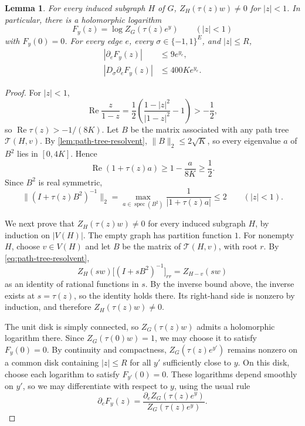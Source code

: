 \documentclass[11pt,reqno,letterpaper]{amsart}
\numberwithin{equation}{section}
\newtheorem{lemma}[lemma]{Lemma}
\theoremstyle{definition}
\theoremstyle{remark}
\newcommand{\norm}[1]{\lVert #1\rVert}
\begin{document}
\begin{lemma}\label{lem:analytic-derivatives}
For every induced subgraph $H$ of $G$,
$Z_H(\tau(z)w)\ne0$ for $|z|<1$. In particular, there is a
holomorphic logarithm
\[
 F_y(z)=\log Z_G(\tau(z)e^y)
 \qquad(|z|<1)
\]
with $F_y(0)=0$. For every edge $e$, every
$\sigma\in\{-1,1\}^E$, and $|z|\le R$,
\begin{align}
 |\partial_eF_y(z)|&\le9e^{y_e},
 \label{eq:analytic-gradient-bound}\\
 |D_\sigma\partial_eF_y(z)|&\le400K e^{y_e}.
 \label{eq:analytic-signed-hessian-bound}
\end{align}
\end{lemma}

\begin{proof}
For $|z|<1$,
\[
 \operatorname{Re}\frac{z}{1-z}
 =\frac12\left(\frac{1-|z|^2}{|1-z|^2}-1\right)>-\frac12,
\]
so $\operatorname{Re}\tau(z)>-1/(8K)$. Let $B$ be the matrix
associated with any path tree $\mathcal T(H,v)$.
By \cref{lem:path-tree-resolvent}, $\norm B_2\le2\sqrt K$,
so every eigenvalue $a$ of $B^2$ lies in $[0,4K]$. Hence
\[
 \operatorname{Re}(1+\tau(z)a)
 \ge1-\frac{a}{8K}\ge\frac12.
\]
Since $B^2$ is real symmetric,
\begin{equation*}
 \norm{(I+\tau(z)B^2)^{-1}}_2
 =\max_{a\in\operatorname{spec}(B^2)}
       \frac1{|1+\tau(z)a|}
 \le2
 \qquad(|z|<1).
\end{equation*}

We next prove that $Z_H(\tau(z)w)\ne0$ for every induced subgraph
$H$, by induction on $|V(H)|$. The empty graph has partition
function $1$. For nonempty $H$, choose $v\in V(H)$ and let $B$
be the matrix of $\mathcal T(H,v)$, with root $r$.
By \cref{eq:path-tree-resolvent},
\[
 Z_H(sw)\bigl[(I+sB^2)^{-1}\bigr]_{rr}=Z_{H-v}(sw)
\]
as an identity of rational functions in $s$. By the inverse bound above,
the inverse exists at $s=\tau(z)$, so the identity holds there.
Its right-hand side is nonzero by induction, and therefore
$Z_H(\tau(z)w)\ne0$.

The unit disk is simply connected, so $Z_G(\tau(z)w)$ admits a
holomorphic logarithm there. Since $Z_G(\tau(0)w)=1$, we may choose
it to satisfy $F_y(0)=0$. By continuity and compactness,
$Z_G(\tau(z)e^{y'})$ remains nonzero on a common disk containing
$|z|\le R$ for all $y'$ sufficiently close to $y$. On this disk,
choose each logarithm to satisfy $F_{y'}(0)=0$. These logarithms
depend smoothly on $y'$, so we may differentiate with respect
to $y$, using the usual rule
\[
 \partial_eF_y(z)
 =\frac{\partial_e Z_G(\tau(z)e^y)}{Z_G(\tau(z)e^y)}.
\]


\end{proof}
\end{document}
